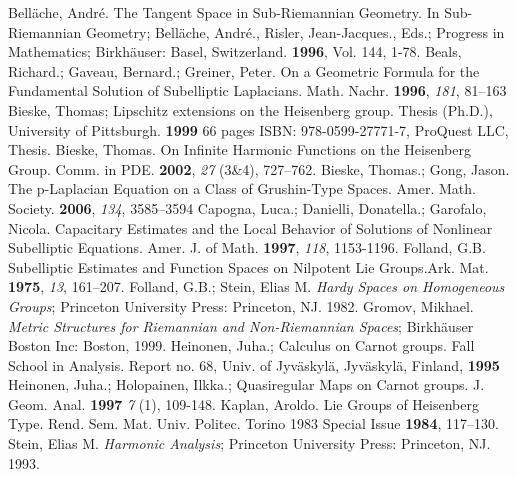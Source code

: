 \documentclass[12pt]{amsart}
\theoremstyle{plain}
\theoremstyle{definition}
\numberwithin{equation}{section}
\begin{document}
\begin{thebibliography}{99}
Bell\"{a}che, Andr\'{e}. The Tangent Space in Sub-Riemannian Geometry. In Sub-Riemannian Geometry; Bell\"{a}che, Andr\'{e}., Risler, Jean-Jacques., Eds.; Progress in Mathematics; Birkh\"{a}user:
Basel, Switzerland. \textbf{1996}, Vol. 144, 1-78.
Beals, Richard.; Gaveau, Bernard.; Greiner, Peter. On a Geometric Formula for the Fundamental Solution of Subelliptic Laplacians. Math. Nachr. \textbf{1996}, \emph{181}, 81--163
Bieske, Thomas; Lipschitz extensions on the Heisenberg group. Thesis (Ph.D.), University of Pittsburgh. \textbf{1999} 66 pages ISBN: 978-0599-27771-7, ProQuest LLC, Thesis.  
Bieske, Thomas. On Infinite Harmonic Functions on the Heisenberg Group. Comm. in PDE. \textbf{2002}, \emph{27} (3\&4), 727--762. 
Bieske, Thomas.; Gong, Jason. The p-Laplacian Equation on a Class of Grushin-Type Spaces. Amer. Math. Society. \textbf{2006}, \emph{134}, 3585--3594
Capogna, Luca.; Danielli, Donatella.; Garofalo, Nicola. Capacitary Estimates and the Local Behavior of Solutions of Nonlinear Subelliptic Equations. Amer. J. of Math. \textbf{1997}, \emph{118}, 1153-1196. 
Folland, G.B. Subelliptic Estimates and Function Spaces on Nilpotent Lie Groups.Ark. Mat. \textbf{1975}, \emph{13}, 161--207.
Folland, G.B.; Stein, Elias M.
\emph{Hardy Spaces on Homogeneous Groups};
Princeton University Press: Princeton, NJ. 1982.
Gromov, Mikhael.
\emph{Metric Structures for Riemannian and  Non-Riemannian  Spaces};
Birkhäuser Boston Inc: Boston, 1999. 
Heinonen, Juha.; Calculus on Carnot groups. Fall School in Analysis. Report no. 68, Univ. of Jyv\"{a}skyl\"{a}, Jyv\"{a}skyl\"{a}, Finland, \textbf{1995}
Heinonen, Juha.; Holopainen, Ilkka.; Quasiregular Maps on Carnot groups. J. Geom. Anal. \textbf{1997} \emph{7} (1), 109-148. 
Kaplan, Aroldo.
Lie Groups of Heisenberg Type.
Rend. Sem. Mat. Univ. Politec. Torino 1983 Special Issue \textbf{1984}, 117--130.
Stein, Elias M. 
\emph{Harmonic Analysis};
Princeton University Press: Princeton, NJ. 1993.
\end{thebibliography}
\end{document}
